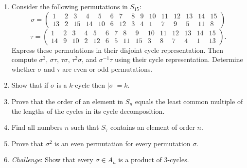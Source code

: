 \documentclass[11pt]{article}
\theoremstyle{definition}  %
\begin{document}

\begin{enumerate}

\item Consider the following permutations in $S_{15}$:
  $$ \sigma = \left( \begin{array}{ccccccccccccccc} 1 & 2 & 3 & 4 & 5 & 6 & 7 & 8 & 9 & 10 & 11 & 12 & 13 & 14 & 15 \\
                       13& 2 &15&14&10& 6 &12& 3 & 4 &   1 &   7 &   9 &   5 & 11 &   8 \end{array} \right) $$
  $$      \tau = \left( \begin{array}{ccccccccccccccc} 1 & 2 & 3 & 4 & 5 & 6 & 7 & 8 & 9 & 10 & 11 & 12 & 13 & 14 & 15 \\
                          14& 9 &10& 2 &12 & 6 & 5 & 11 & 15 &   3 &   8 &   7 &   4 & 1 &   13 \end{array} \right). $$
Express these permutations in their disjoint cycle representation. Then 
compute $\sigma^2$, $\sigma \tau$, $\tau \sigma$, $\tau^2\sigma$, and $\sigma^{-1} \tau$ using their cycle representation. Determine whether
$\sigma$ and $\tau$ are even or odd permutations. 
\item Show that if $\sigma$ is a $k$-cycle then $|\sigma| = k$.
\item Prove that the order of an element in $S_n$ equals the least common multiple of the lengths of the cycles in its cycle decomposition.
\item Find all numbers $n$ such that $S_7$ contains an element of order $n$. 
\item Prove that $\sigma^2$ is an even permutation for every permutation $\sigma$. 
\item {\it Challenge}: Show that every $\sigma \in A_n$ is a product of $3$-cycles.

\end{enumerate}
\end{document}
